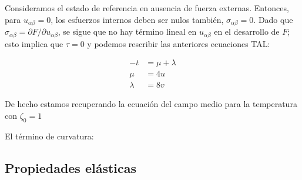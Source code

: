 Consideramos el estado de referencia en ausencia de fuerza externas. Entonces,
para $u_{\alpha\beta}=0$, los esfuerzos internos deben ser nulos también,
$\sigma_{\alpha\beta}=0$. Dado que $\sigma_{\alpha\beta}=\partial F / \partial
u_{\alpha\beta}$, se sigue que no hay término lineal en $u_{\alpha\beta}$ en
el desarrollo de $F$; esto implica que $\tau=0$ y podemos rescribir las
anteriores ecuaciones TAL:

\begin{align}
-t&=\mu+\lambda\\
\mu&=4u\\
\lambda&=8v
\end{align}   

De hecho estamos recuperando la ecuación del campo medio para la temperatura
con $\zeta_0=1$

El término de curvatura:

\subsection{Propiedades elásticas}

